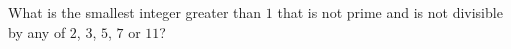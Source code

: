 What is the smallest integer greater than $1$ that is not prime and is not divisible by any of $2$, $3$, $5$, $7$ or $11$?
